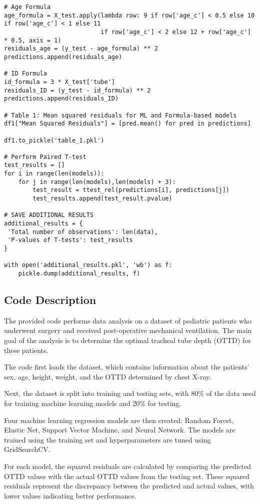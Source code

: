\documentclass[11pt]{article}
\begin{document}
\begin{verbatim}
# Age Formula
age_formula = X_test.apply(lambda row: 9 if row['age_c'] < 0.5 else 10 if row['age_c'] < 1 else 11 
                           if row['age_c'] < 2 else 12 + row['age_c'] * 0.5, axis = 1)
residuals_age = (y_test - age_formula) ** 2
predictions.append(residuals_age)

# ID Formula
id_formula = 3 * X_test['tube']
residuals_ID = (y_test - id_formula) ** 2
predictions.append(residuals_ID)

# Table 1: Mean squared residuals for ML and Formula-based models
df1["Mean Squared Residuals"] = [pred.mean() for pred in predictions]

df1.to_pickle('table_1.pkl')

# Perform Paired T-test
test_results = []
for i in range(len(models)):
    for j in range(len(models),len(models) + 3):
        test_result = ttest_rel(predictions[i], predictions[j])
        test_results.append(test_result.pvalue)

# SAVE ADDITIONAL RESULTS
additional_results = {
 'Total number of observations': len(data), 
 'P-values of T-tests': test_results
}

with open('additional_results.pkl', 'wb') as f:
    pickle.dump(additional_results, f)

\end{verbatim}

\subsection{Code Description}

The provided code performs data analysis on a dataset of pediatric patients who underwent surgery and received post-operative mechanical ventilation. The main goal of the analysis is to determine the optimal tracheal tube depth (OTTD) for these patients.

The code first loads the dataset, which contains information about the patients' sex, age, height, weight, and the OTTD determined by chest X-ray.

Next, the dataset is split into training and testing sets, with 80\% of the data used for training machine learning models and 20\% for testing.

Four machine learning regression models are then created: Random Forest, Elastic Net, Support Vector Machine, and Neural Network. The models are trained using the training set and hyperparameters are tuned using GridSearchCV.

For each model, the squared residuals are calculated by comparing the predicted OTTD values with the actual OTTD values from the testing set. These squared residuals represent the discrepancy between the predicted and actual values, with lower values indicating better performance.
\end{document}
